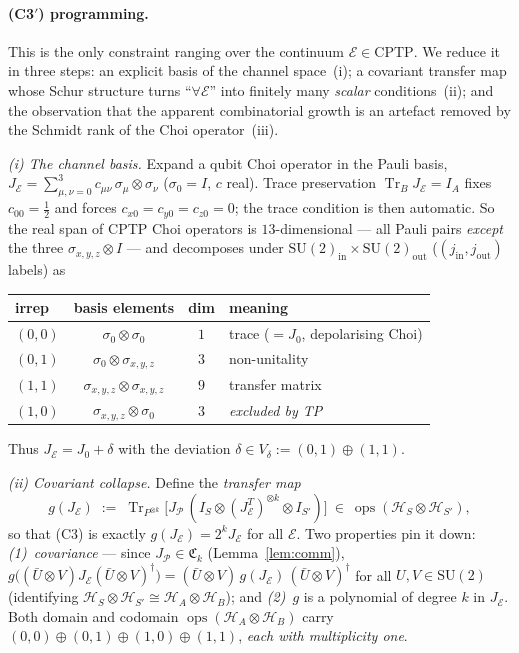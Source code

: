 \documentclass[11pt]{article}
\newcommand{\Tr}{\operatorname{Tr}}
\newcommand{\HH}{\mathcal{H}}
\newcommand{\cP}{\mathcal{P}}
\newcommand{\cE}{\mathcal{E}}
\newcommand{\SU}{\mathrm{SU}}
\newcommand{\CPTP}{\mathrm{CPTP}}
\newcommand{\ox}{\otimes}
\newcommand{\dg}{\dagger}
\begin{document}
\paragraph{(C3$'$) programming.} This is the only constraint ranging over the continuum
$\cE\in\CPTP$. We reduce it in three steps: an explicit basis of the channel space~(i); a
covariant transfer map whose Schur structure turns ``$\forall\cE$'' into finitely many
\emph{scalar} conditions~(ii); and the observation that the apparent combinatorial growth is
an artefact removed by the Schmidt rank of the Choi operator~(iii).

\smallskip\noindent\emph{(i) The channel basis.} Expand a qubit Choi operator in the Pauli
basis, $J_\cE=\sum_{\mu,\nu=0}^{3}c_{\mu\nu}\,\sigma_\mu\ox\sigma_\nu$ ($\sigma_0=I$, $c$
real). Trace preservation $\Tr_B J_\cE=I_A$ fixes $c_{00}=\tfrac12$ and forces
$c_{x0}=c_{y0}=c_{z0}=0$; the trace condition is then automatic. So the real span of CPTP
Choi operators is $13$-dimensional --- all Pauli pairs \emph{except} the three
$\sigma_{x,y,z}\ox I$ --- and decomposes under
$\SU(2)_{\mathrm{in}}\times\SU(2)_{\mathrm{out}}$ ($(j_{\mathrm{in}},j_{\mathrm{out}})$
labels) as
\begin{center}\small
\begin{tabular}{lccl}
\hline
irrep & basis elements & dim & meaning\\\hline
$(0,0)$ & $\sigma_0\ox\sigma_0$ & $1$ & trace ($=J_0$, depolarising Choi)\\
$(0,1)$ & $\sigma_0\ox\sigma_{x,y,z}$ & $3$ & non-unitality\\
$(1,1)$ & $\sigma_{x,y,z}\ox\sigma_{x,y,z}$ & $9$ & transfer matrix\\\hline
$(1,0)$ & $\sigma_{x,y,z}\ox\sigma_0$ & $3$ & \emph{excluded by TP}\\
\hline
\end{tabular}
\end{center}
Thus $J_\cE=J_0+\delta$ with the deviation $\delta\in V_\delta:=(0,1)\oplus(1,1)$.

\smallskip\noindent\emph{(ii) Covariant collapse.} Define the \emph{transfer map}
\begin{equation}\label{eq:transfer}
g(J_\cE)\;:=\;\Tr_{P^{\ox k}}\!\big[J_\cP\,(I_S\ox(J_\cE^T)^{\ox k}\ox I_{S'})\big]
\ \in\ \operatorname{ops}(\HH_S\ox\HH_{S'}),
\end{equation}
so that (C3) is exactly $g(J_\cE)=2^k J_\cE$ for all $\cE$. Two properties pin it down:
\emph{(1)~covariance} --- since $J_\cP\in\mathfrak{C}_k$ (Lemma~\ref{lem:comm}),
$g\big((\bar U\ox V)J_\cE(\bar U\ox V)^\dg\big)=(\bar U\ox V)\,g(J_\cE)\,(\bar U\ox V)^\dg$
for all $U,V\in\SU(2)$ (identifying $\HH_S\ox\HH_{S'}\cong\HH_A\ox\HH_B$); and
\emph{(2)}~$g$ is a polynomial of degree $k$ in $J_\cE$. Both domain and codomain
$\operatorname{ops}(\HH_A\ox\HH_B)$ carry $(0,0)\oplus(0,1)\oplus(1,0)\oplus(1,1)$,
\emph{each with multiplicity one}.
\end{document}
